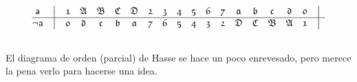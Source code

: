 \documentclass[final,12pt,a4paper,twoside,fleqn]{extbook}
\theoremstyle{definition}
\theoremstyle{remark}
\begin{document}
\begin{equation}
  \begin{array}{@{}*{22}c@{}}
      {\textsf{a}}                 &%
      \big\vert                    &%
      {\mathfrak{1}}               &%
      {\mathfrak{A}}               &%
      {\mathfrak{B}}               &%
      {\mathfrak{C}}               &%
      {\mathfrak{D}}               &%
      {\mathfrak{2}}               &%
      {\mathfrak{3}}               &%
      {\mathfrak{4}}               &%
      {\mathfrak{5}}               &%
      {\mathfrak{6}}               &%
      {\mathfrak{7}}               &%
      {\mathfrak{a}}               &%
      {\mathfrak{b}}               &%
      {\mathfrak{c}}               &%
      {\mathfrak{d}}               &%
      {\mathfrak{0}}               &%
      \big\vert                     %
      \\ \hline \nonumber
      {\neg\textsf{a}}             &%
      \big\vert                    &%
      {\mathfrak{0}}               &%
      {\mathfrak{d}}               &%
      {\mathfrak{c}}               &%
      {\mathfrak{b}}               &%
      {\mathfrak{a}}               &%
      {\mathfrak{7}}               &%
      {\mathfrak{6}}               &%
      {\mathfrak{5}}               &%
      {\mathfrak{4}}               &%
      {\mathfrak{3}}               &%
      {\mathfrak{2}}               &%
      {\mathfrak{D}}               &%
      {\mathfrak{C}}               &%
      {\mathfrak{B}}               &%
      {\mathfrak{A}}               &%
      {\mathfrak{1}}               &%
      \big\vert                     %
      \\ \nonumber
    \end{array}
\end{equation}



	El diagrama de orden (parcial) de Hasse se hace un poco enrevesado, pero
merece la pena verlo para hacerse una idea.
\end{document}
